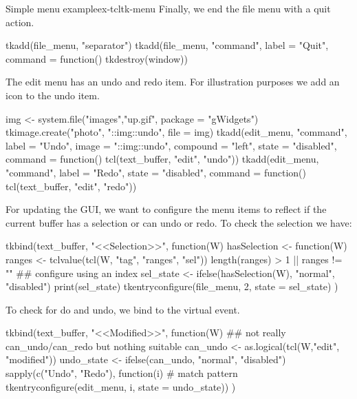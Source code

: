 \begin{example}{Simple menu example}{ex-tcltk-menu}
Finally, we end the file menu with a quit action. 
\begin{Schunk}
\begin{Sinput}
 tkadd(file_menu, "separator")
 tkadd(file_menu, "command", label = "Quit", 
       command = function() tkdestroy(window))
\end{Sinput}
\end{Schunk}

The edit menu has an undo and redo item. For illustration purposes we add an icon to the undo item.
\begin{Schunk}
\begin{Sinput}
 img <- system.file("images","up.gif", package = "gWidgets")
 tkimage.create("photo", "::img::undo", file = img)
 tkadd(edit_menu, "command", label = "Undo",
       image = "::img::undo", compound = "left", state = "disabled",
       command = function() tcl(text_buffer, "edit", "undo"))
 tkadd(edit_menu, "command", label = "Redo", state = "disabled",
       command = function() tcl(text_buffer, "edit", "redo"))
\end{Sinput}
\end{Schunk}

For updating the GUI, we want to configure the menu items to reflect
if the current buffer has a selection or can undo or redo. To check
the selection we have:
\begin{Schunk}
\begin{Sinput}
 tkbind(text_buffer, "<<Selection>>", function(W) {
   hasSelection <- function(W) {
     ranges <- tclvalue(tcl(W, "tag", "ranges", "sel"))
     length(ranges) > 1 || ranges != ""
   }
   ## configure using an index
   sel_state <- ifelse(hasSelection(W), "normal", "disabled")
   print(sel_state)
   tkentryconfigure(file_menu, 2, state = sel_state)
 })
\end{Sinput}
\end{Schunk}
To check for do and undo, we bind to the  virtual event.
\begin{Schunk}
\begin{Sinput}
 tkbind(text_buffer, "<<Modified>>", function(W) {
   ## not really can_undo/can_redo but nothing suitable
   can_undo <- as.logical(tcl(W,"edit", "modified"))
   undo_state <- ifelse(can_undo, "normal", "disabled")
   sapply(c("Undo", "Redo"), function(i)        # match pattern
          tkentryconfigure(edit_menu, i, state = undo_state)) 
 })
\end{Sinput}
\end{Schunk}



\end{example}
